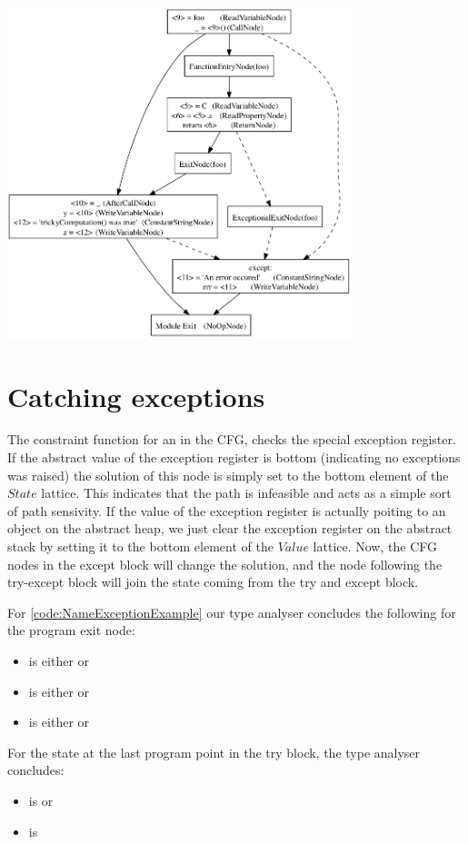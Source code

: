 \begin{listing}[H]
	\begin{center}
		\includegraphics[width=0.75\textwidth]{images/exception1.png}
	\end{center}
	\vspace{-10pt}
\end{listing}


\section{Catching exceptions}
The constraint function for an  in the CFG, checks the special exception register. If the abstract value of the exception register is bottom (indicating no exceptions was raised) the solution of this node is simply set to the bottom element of the $State$ lattice. This indicates that the path is infeasible and acts as a simple sort of path sensivity. If the value of the exception register is actually poiting to an object on the abstract heap, we just clear the exception register on the abstract stack by setting it to the bottom element of the $Value$ lattice. Now, the CFG nodes in the except block will change the solution, and the node following the try-except block will join the state coming from the try and except block.

For \autoref{code:NameExceptionExample} our type analyser concludes the following for the program exit node:

\begin{itemize}
	\vspace{-5pt}
	\item {} is either  or 
	\item {} is either  or 
	\item {} is either  or 
	\vspace{-5pt}
\end{itemize}

For the state at the last program point in the try block, the type analyser concludes:

\begin{itemize}
	\vspace{-5pt}
	\item {} is  or 
	\item {} is 
	\vspace{-5pt}
\end{itemize}